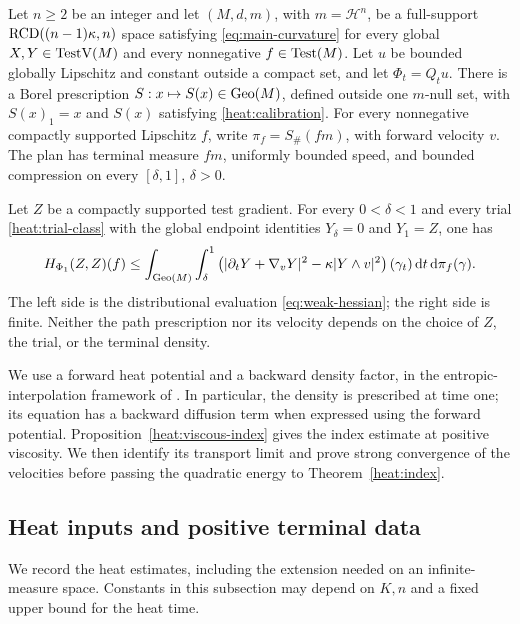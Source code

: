\begin{theorem}
\label{heat:index}
Let \(n\ge2\) be an integer and let \((M,d,m)\), with
\(m=\mathcal H^n\), be a full-support \(\mathrm{RCD}((n-1)\kappa,n)\)
space satisfying \eqref{eq:main-curvature} for every global
\(X,Y\in\operatorname{TestV}(M)\) and every nonnegative \(f\in\operatorname{Test}(M)\).
Let \(u\) be bounded globally Lipschitz
and constant outside a compact set, and let \(\Phi_t=Q_tu\).
There is a Borel prescription \(S:x\mapsto S(x)\in\operatorname{Geo}(M)\),
defined outside one \(m\)-null set, with \(S(x)_1=x\) and
\(S(x)\) satisfying \eqref{heat:calibration}. For every
nonnegative compactly supported Lipschitz \(f\), write
\(\pi_f=S_\#(fm)\), with forward velocity \(v\).
The plan has terminal measure \(fm\), uniformly bounded
speed, and bounded compression on every \([\delta,1]\),
\(\delta>0\).

Let \(Z\) be a compactly supported test gradient. For every
\(0<\delta<1\) and every trial \eqref{heat:trial-class}
with the global endpoint identities
\(Y_\delta=0\) and \(Y_1=Z\), one has
\begin{equation}
\label{heat:index-inequality}
H_{\Phi_1}(Z,Z)(f)
\le\int_{\operatorname{Geo}(M)}\int_\delta^1
\left(|\partial_tY+\nabla_vY|^2
-\kappa|Y\wedge v|^2\right)(\gamma_t)
\,\mathrm d t\,\mathrm d\pi_f(\gamma).
\end{equation}
The left side is the distributional evaluation
\eqref{eq:weak-hessian}; the right side is finite. Neither
the path prescription nor its velocity depends on the
choice of \(Z\), the trial, or the terminal density.
\end{theorem}

We use a forward heat potential and a backward
density factor, in the entropic-interpolation framework of
\cite{Leonard2017,GigliTamanini2021}. In particular, the density is prescribed at time
one; its equation has a backward diffusion term when expressed
using the forward potential.
Proposition~\ref{heat:viscous-index} gives the index estimate
at positive viscosity. We then identify its transport limit
and prove strong convergence of the velocities before passing
the quadratic energy to Theorem~\ref{heat:index}.

\subsection{Heat inputs and positive terminal data}

We record the heat estimates, including the extension needed on
an infinite-measure space. Constants in this subsection may depend
on \(K,n\) and a fixed upper bound for the heat time.

